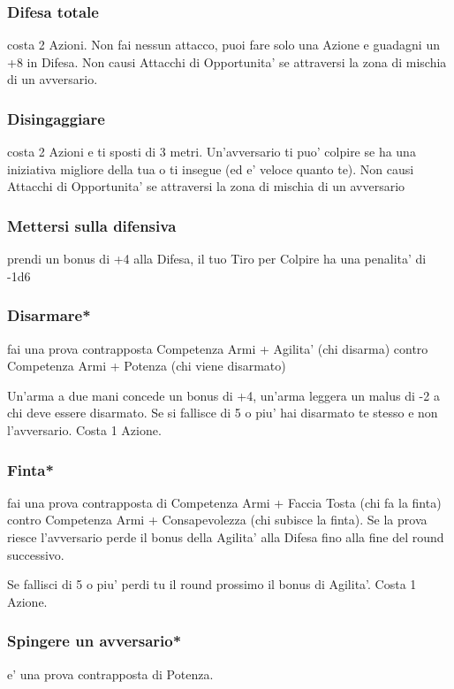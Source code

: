 \documentclass[a4paper,11pt,twoside,openany]{book}
\begin{document}
	\subsubsection{Difesa totale} costa 2 Azioni. Non fai nessun attacco, puoi fare solo una Azione e guadagni un +8 in Difesa. Non causi Attacchi di Opportunita' se attraversi la zona di mischia di un avversario.
	
	\subsubsection{Disingaggiare} costa 2 Azioni e ti sposti di 3 metri. Un'avversario ti puo' colpire se ha una iniziativa migliore della tua o ti insegue (ed e' veloce quanto te). Non causi Attacchi di Opportunita' se attraversi la zona di mischia di un avversario
	
	\subsubsection{Mettersi sulla difensiva} prendi un bonus di +4 alla Difesa, il tuo Tiro per Colpire ha una penalita' di -1d6
	
	\subsubsection{Disarmare*} fai una prova contrapposta Competenza Armi + Agilita' (chi disarma) contro Competenza Armi + Potenza (chi viene disarmato)
	
	Un'arma a due mani concede un bonus di +4, un'arma leggera un malus di -2 a chi deve essere disarmato. Se si fallisce di 5 o piu' hai disarmato te stesso e non l'avversario. Costa 1 Azione.
	
	\subsubsection{Finta*} fai una prova contrapposta di Competenza Armi + Faccia Tosta (chi fa la finta) contro Competenza Armi + Consapevolezza (chi subisce la finta). Se la prova riesce l'avversario perde il bonus della Agilita' alla Difesa fino alla fine del round successivo.
	
	Se fallisci di 5 o piu' perdi tu il round prossimo il bonus di Agilita'.
	Costa 1 Azione.
	
	\subsubsection{Spingere un avversario*} e' una prova contrapposta di Potenza.
	
\end{document}
